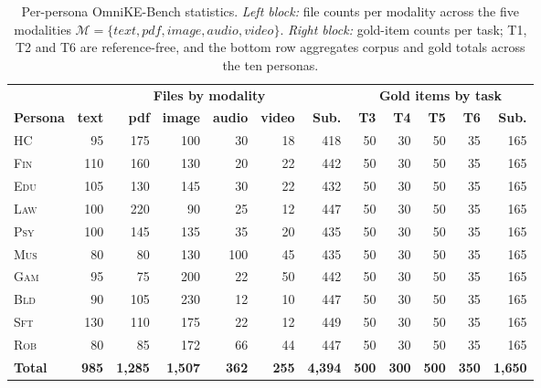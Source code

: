\documentclass{article}
\begin{document}
\begin{table}[h!t]
\centering
\caption{Per-persona OmniKE-Bench statistics. \emph{Left block:} file counts per modality across the five modalities $\mathcal{M}\!=\!\{\textit{text}, \textit{pdf}, \textit{image}, \textit{audio}, \textit{video}\}$. \emph{Right block:} gold-item counts per task; T1, T2 and T6 are reference-free, and the bottom row aggregates corpus and gold totals across the ten personas.}
\label{tab:bench-stats}
\setlength{\tabcolsep}{4.5pt}\renewcommand{\arraystretch}{1.05}
\small
\begin{tabular}{l|rrrrr|r||rrrr|r}
\toprule
& \multicolumn{6}{c||}{\textbf{Files by modality}} & \multicolumn{5}{c}{\textbf{Gold items by task}} \\
\textbf{Persona} & \textbf{text} & \textbf{pdf} & \textbf{image} & \textbf{audio} & \textbf{video} & \textbf{Sub.} & \textbf{T3} & \textbf{T4} & \textbf{T5} & \textbf{T6} & \textbf{Sub.} \\
\midrule
\textsc{HC}  & 95  & 175    & 100    & 30  & 18  & 418   & 50  & 30  & 50  & 35  & 165 \\
\textsc{Fin} & 110 & 160    & 130    & 20  & 22  & 442   & 50  & 30  & 50  & 35  & 165 \\
\textsc{Edu} & 105 & 130    & 145    & 30  & 22  & 432   & 50  & 30  & 50  & 35  & 165 \\
\textsc{Law} & 100 & 220    & 90     & 25  & 12  & 447   & 50  & 30  & 50  & 35  & 165 \\
\textsc{Psy} & 100 & 145    & 135    & 35  & 20  & 435   & 50  & 30  & 50  & 35  & 165 \\
\textsc{Mus} & 80  & 80     & 130    & 100 & 45  & 435   & 50  & 30  & 50  & 35  & 165 \\
\textsc{Gam} & 95  & 75     & 200    & 22  & 50  & 442   & 50  & 30  & 50  & 35  & 165 \\
\textsc{Bld} & 90  & 105    & 230    & 12  & 10  & 447   & 50  & 30  & 50  & 35  & 165 \\
\textsc{Sft} & 130 & 110    & 175    & 22  & 12  & 449   & 50  & 30  & 50  & 35  & 165 \\
\textsc{Rob} & 80  & 85     & 172    & 66  & 44  & 447   & 50  & 30  & 50  & 35  & 165 \\
\midrule
\textbf{Total} & \textbf{985} & \textbf{1{,}285} & \textbf{1{,}507} & \textbf{362} & \textbf{255} & \textbf{4{,}394} & \textbf{500} & \textbf{300} & \textbf{500} & \textbf{350} & \textbf{1{,}650} \\
\bottomrule
\end{tabular}
\end{table}
\end{document}
